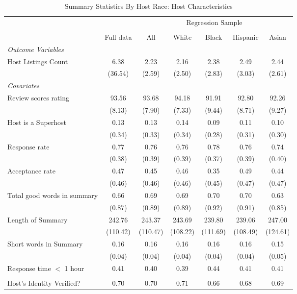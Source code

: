 \begin{table}[htbp]
\caption{Summary Statistics By Host Race: Host Characteristics}
\begin{center}%
\small\begin{tabular}{l c | c | c c c c}
& \multicolumn{1}{c}{} & \multicolumn{5}{c}{Regression Sample}
\\
 \cmidrule(r){3-7}
\\
 & \multicolumn{1}{c}{Full data} & \multicolumn{1}{c}{All} & White & Black & Hispanic & Asian
\\
\hline\hline\noalign{\smallskip} 
 \textit{\textit{Outcome Variables}} & & & & & & \\ Host Listings Count & 6.38 & 2.23 & 2.16 & 2.38 & 2.49 & 2.44 \\
 & (36.54) & (2.59) & (2.50) & (2.83) & (3.03) & (2.61) \\
 \textit{Covariates} & & & & & & \\ \hline Review scores rating & 93.56 & 93.68 & 94.18 & 91.91 & 92.80 & 92.26 \\
 & (8.13) & (7.90) & (7.33) & (9.44) & (8.71) & (9.27) \\
 Host is a Superhost & 0.13 & 0.13 & 0.14 & 0.09 & 0.11 & 0.10 \\
 & (0.34) & (0.33) & (0.34) & (0.28) & (0.31) & (0.30) \\
 Response rate & 0.77 & 0.76 & 0.76 & 0.78 & 0.76 & 0.74 \\
 & (0.38) & (0.39) & (0.39) & (0.37) & (0.39) & (0.40) \\
 Acceptance rate & 0.47 & 0.45 & 0.46 & 0.35 & 0.49 & 0.44 \\
 & (0.46) & (0.46) & (0.46) & (0.45) & (0.47) & (0.47) \\
 Total good words in summary & 0.66 & 0.69 & 0.69 & 0.70 & 0.70 & 0.63 \\
 & (0.87) & (0.89) & (0.89) & (0.92) & (0.91) & (0.85) \\
 Length of Summary & 242.76 & 243.37 & 243.69 & 239.80 & 239.06 & 247.00 \\
 & (110.42) & (110.47) & (108.22) & (111.69) & (108.49) & (124.61) \\
 Short words in Summary & 0.16 & 0.16 & 0.16 & 0.16 & 0.16 & 0.15 \\
 & (0.04) & (0.04) & (0.04) & (0.04) & (0.04) & (0.05) \\
 Response time $<$ 1 hour & 0.41 & 0.40 & 0.39 & 0.44 & 0.41 & 0.41 \\  &  &  &  &  &  &  \\ Host's Identity Verified? & 0.70 & 0.70 & 0.71 & 0.66 & 0.68 & 0.69 \\

\end{tabular}
\end{center}
\end{table}
